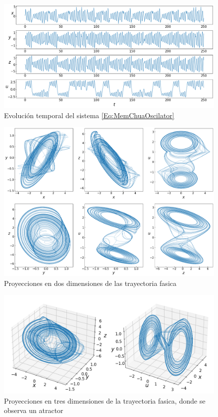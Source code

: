 \documentclass[11pt,letterpaper]{article}
\begin{document}
\begin{multicols*}{2}
\begin{figure}[H]
    \centering
    \includegraphics[scale=0.245]{Memristor-basedChuaOscillator1D.png}
    \caption{Evolución temporal del sistema \ref{Eq:MemChuaOscilator}}
    \label{Fig:ChuaCircuit1D}
\end{figure}

\begin{figure}[H]
    \centering
    \includegraphics[scale=0.205]{Memristor-basedChuaOscillator2Dv2.png}
    \caption{Proyecciones en dos dimensiones de las trayectoria fasica}
    \label{Fig:ChuaCircuit2D}
\end{figure}

\begin{figure}[H]
    \includegraphics[scale=0.32]{Memristor-basedChuaOscillator3D.png}
    \caption{Proyecciones en tres dimensiones de la trayectoria fasica, donde se observa un atractor}
    \label{Fig:ChuaCircuit3D}
\end{figure}


\end{multicols*}
\end{document}
